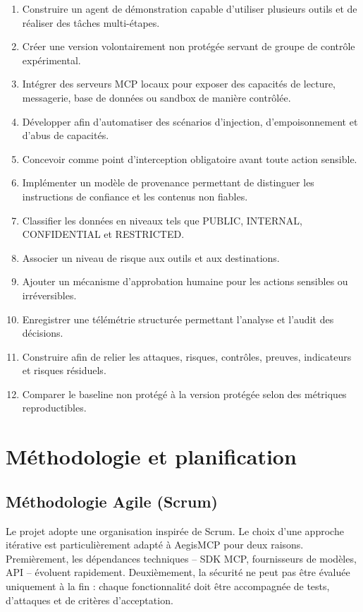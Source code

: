 \begin{enumerate}[label=O\arabic*.]
    \item Construire un agent de démonstration capable d'utiliser plusieurs outils et de réaliser des tâches multi-étapes.
    \item Créer une version volontairement non protégée servant de groupe de contrôle expérimental.
    \item Intégrer des serveurs MCP locaux pour exposer des capacités de lecture, messagerie, base de données ou sandbox de manière contrôlée.
    \item Développer \Red{} afin d'automatiser des scénarios d'injection, d'empoisonnement et d'abus de capacités.
    \item Concevoir \Guard{} comme point d'interception obligatoire avant toute action sensible.
    \item Implémenter un modèle de provenance permettant de distinguer les instructions de confiance et les contenus non fiables.
    \item Classifier les données en niveaux tels que PUBLIC, INTERNAL, CONFIDENTIAL et RESTRICTED.
    \item Associer un niveau de risque aux outils et aux destinations.
    \item Ajouter un mécanisme d'approbation humaine pour les actions sensibles ou irréversibles.
    \item Enregistrer une télémétrie structurée permettant l'analyse et l'audit des décisions.
    \item Construire \GRC{} afin de relier les attaques, risques, contrôles, preuves, indicateurs et risques résiduels.
    \item Comparer le baseline non protégé à la version protégée selon des métriques reproductibles.
\end{enumerate}

\section{Méthodologie et planification}

\subsection{Méthodologie Agile (Scrum)}

Le projet adopte une organisation inspirée de Scrum. Le choix d'une approche itérative est particulièrement adapté à AegisMCP pour deux raisons. Premièrement, les dépendances techniques -- SDK MCP, fournisseurs de modèles, API -- évoluent rapidement. Deuxièmement, la sécurité ne peut pas être évaluée uniquement à la fin : chaque fonctionnalité doit être accompagnée de tests, d'attaques et de critères d'acceptation.

